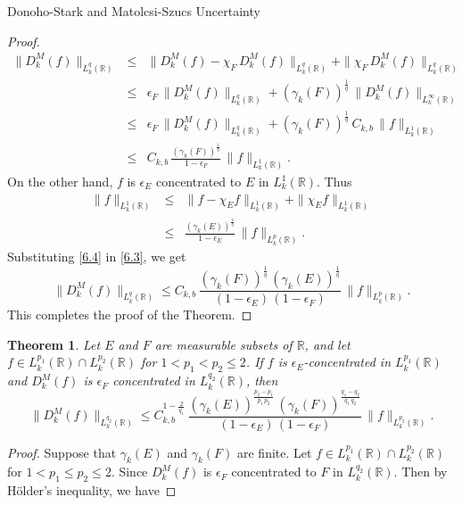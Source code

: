 \documentclass[12pt,a4paper,reqno]{amsproc}
\newtheorem{theorem}{Theorem}[section]
\theoremstyle{definition}
\theoremstyle{remark}
\numberwithin{equation}{section}
\begin{document}
\begin{subsection}{Donoho-Stark and Matolcsi-Szucs Uncertainty}
\begin{proof}
\begin{eqnarray}\label{6.3}
\nonumber        \|D_k^M(f)\|_{L_k^{q}(\mathbb{R})}&\le&\|D_k^M(f)-\chi_{F}\, D_k^M(f)\|_{L_k^{q}(\mathbb{R})}+\|\chi_{F}\, D_k^M(f)\|_{L^{q}_k(\mathbb{R})}
\\
\nonumber &\le& \epsilon_{F}\,\|D_k^M(f)\|_{L_k^{q}(\mathbb{R})}+(\gamma_k({F}))^{\frac{1}{q}}\, \|D_k^M(f)\|_{L_k^\infty(\mathbb{R})}\\
\nonumber        &\le& \epsilon_{F}\,\|D_k^M(f)\|_{L_k^{q}(\mathbb{R})}+(\gamma_k({F}))^{\frac{1}{q}}\,C_{k,b}\, \|f\|_{L_k^1(\mathbb{R})} \\
&\le&C_{k,b}\, \frac{(\gamma_k(F))^{\frac{1}{q}}}{1-\epsilon_{F}}\, \|f\|_{L^1_k(\mathbb{R})}.
\end{eqnarray}
On the other hand, $f$ is $\epsilon_E$ concentrated to $E$ in $L_k^1(\mathbb{R})$. Thus
\begin{eqnarray} \label{6.4}
\nonumber    \|f\|_{L_k^1(\mathbb{R})} &\le& \|f-\chi_Ef\|_{L_k^1(\mathbb{R})}+\|\chi_Ef\|_{L_k^1(\mathbb{R})}\\
    &\le& \frac{(\gamma_k(E))^{\frac{1}{q}}}{1-\epsilon_E}\,\|f\|_{L_k^p(\mathbb{R})}.
\end{eqnarray}
Substituting \eqref{6.4} in \eqref{6.3}, we get
\begin{equation*}
     \|D_k^M(f)\|_{L_k^{q}(\mathbb{R})}\le C_{k,b}\,\frac{(\gamma_k(F))^{\frac{1}{q}}\, (\gamma_k(E))^{\frac{1}{q}}}{(1-\epsilon_E)\,(1-\epsilon_{F})}\,\|f\|_{L_k^{p}(\mathbb{R})}.
 \end{equation*}
 This completes the proof of the Theorem.
 \end{proof}
 \begin{theorem}
  Let $E$ and $F$ are measurable subsets of $\mathbb{R}$, and let $ f\in L_k^{p_1}(\mathbb{R})\cap L^{p_2}_k(\mathbb{R})$ for $1<p_1<p_2\le 2$. If $f$ is $\epsilon_E$-concentrated in $L_k^{p_1}(\mathbb{R})$ and $D_k^M(f)$ is $\epsilon_{F}$ concentrated in $L_k^{q_2}(\mathbb{R})$, then 
  \begin{equation*}
      \|D_k^M(f)\|_{L_k^{q_2}(\mathbb{R})} \le C_{k,b}^{1-\frac{2}{q_1}}\, \frac{(\gamma_k(E))^{\frac{p_2-p_1}{p_1\,p_2}}\, (\gamma_k(F))^{\frac{q_1-q_2}{q_1\,q_2}}}{(1-\epsilon_E)\,(1-\epsilon_{F})}\, \|f\|_{L_k^{p_2}(\mathbb{R})}.
  \end{equation*}
 \end{theorem}
\begin{proof}
    Suppose that $\gamma_k(E)$ and $\gamma_k(F)$ are finite. Let $f\in L_k^{p_1}(\mathbb{R})\cap L_k^{p_2}(\mathbb{R})$ for $1<p_1\le p_2 \le 2.$ Since $D_k^M(f)$ is $\epsilon_{F}$  concentrated to $F$ in $L_k^{q_2}(\mathbb{R})$. Then by H{\"o}lder's inequality, we have

\end{proof}
\end{subsection}
\end{document}
